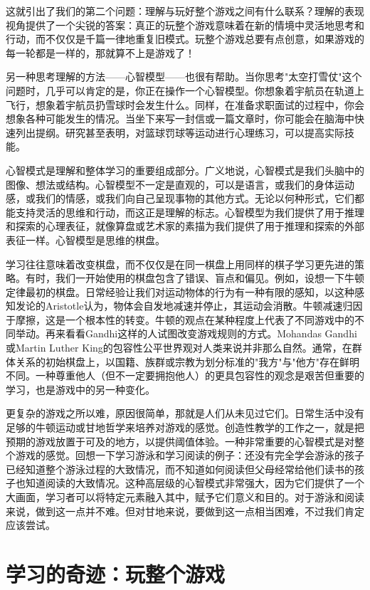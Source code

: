 这就引出了我们的第二个问题：理解与玩好整个游戏之间有什么联系？理解的表现视角提供了一个尖锐的答案：真正的玩整个游戏意味着在新的情境中灵活地思考和行动，而不仅仅是千篇一律地重复旧模式。玩整个游戏总要有点创意，如果游戏的每一轮都是一样的，那就算不上是游戏了！

另一种思考理解的方法——心智模型——也很有帮助。当你思考"太空打雪仗"这个问题时，几乎可以肯定的是，你正在操作一个心智模型。你想象着宇航员在轨道上飞行，想象着宇航员扔雪球时会发生什么。同样，在准备求职面试的过程中，你会想象各种可能发生的情况。当坐下来写一封信或一篇文章时，你可能会在脑海中快速列出提纲。研究甚至表明，对篮球罚球等运动进行心理练习，可以提高实际技能。

心智模式是理解和整体学习的重要组成部分。广义地说，心智模式是我们头脑中的图像、想法或结构。心智模型不一定是直观的，可以是语言，或我们的身体运动感，或我们的情感，或我们向自己呈现事物的其他方式。无论以何种形式，它们都能支持灵活的思维和行动，而这正是理解的标志。心智模型为我们提供了用于推理和探索的心理表征，就像算盘或艺术家的素描为我们提供了用于推理和探索的外部表征一样。心智模型是思维的棋盘。

学习往往意味着改变棋盘，而不仅仅是在同一棋盘上用同样的棋子学习更先进的策略。有时，我们一开始使用的棋盘包含了错误、盲点和偏见。例如，设想一下牛顿定律最初的棋盘。日常经验让我们对运动物体的行为有一种有限的感知，以这种感知发论的Aristotle认为，物体会自发地减速并停止，其运动会消散。牛顿减速归因于摩擦，这是一个根本性的转变。牛顿的观点在某种程度上代表了不同游戏中的不同举动。再来看看Gandhi这样的人试图改变游戏规则的方式。Mohandas Gandhi或Martin Luther King的包容性公平世界观对人类来说并非那么自然。通常，在群体关系的初始棋盘上，以国籍、族群或宗教为划分标准的"我方"与"他方"存在鲜明不同。一种尊重他人（但不一定要拥抱他人）的更具包容性的观念是艰苦但重要的学习，也是游戏中的另一种变化。

更复杂的游戏之所以难，原因很简单，那就是人们从未见过它们。日常生活中没有足够的牛顿运动或甘地哲学来培养对游戏的感觉。创造性教学的工作之一，就是把预期的游戏放置于可及的地方，以提供阈值体验。一种非常重要的心智模式是对整个游戏的感觉。回想一下学习游泳和学习阅读的例子：还没有完全学会游泳的孩子已经知道整个游泳过程的大致情况，而不知道如何阅读但父母经常给他们读书的孩子也知道阅读的大致情况。这种高层级的心智模式非常强大，因为它们提供了一个大画面，学习者可以将特定元素融入其中，赋予它们意义和目的。对于游泳和阅读来说，做到这一点并不难。但对甘地来说，要做到这一点相当困难，不过我们肯定应该尝试。

\section*{学习的奇迹：玩整个游戏}

